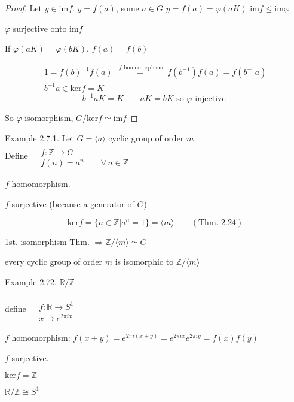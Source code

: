 \documentclass[twoside,landscape]{amsart}
\theoremstyle{plain}
\theoremstyle{definition}
\theoremstyle{remark}
\begin{document}
\begin{multicols*}{2}
\begin{proof}
Let $y\in \text{im}{f}$.  $y=f(a)$, some $a\in G$  \quad \quad $y= f(a) = \varphi(aK)$  \quad \quad $\text{im}{f} \leq \text{im}{\varphi}$

$\varphi$ surjective onto $\text{im}{f}$

If $\varphi(aK) = \varphi(bK)$, $f(a) = f(b)$ 

\[
\begin{gathered}
1 = f(b)^{-1} f(a) \overset{\text{ $f$ homomorphism }}{=} f(b^{-1}) f(a) = f(b^{-1} a)  \\
b^{-1} a \in \text{ker}{f} = K
\end{gathered}
\]
\[
b^{-1} a K = K \quad \quad aK = bK \text{ so  $\varphi$ injective }
\]

So $\varphi $ isomorphism, $G/\text{ker}{f} \simeq \text{im}{f}$

\end{proof}

Example 2.7.1. Let $G = \langle a \rangle$ cyclic group of order $m$ \\
Define $\begin{aligned} & \quad \\ 
  & f: \mathbb{Z} \to G \\
  & f(n) = a^n \quad \quad \forall \, n \in \mathbb{Z} \end{aligned}$

$f$ homomorphism.  

$f$ surjective (because a generator of $G$)

\[
\text{ker}{f} = \lbrace n\in \mathbb{Z} | a^n = 1 \rbrace = \langle m \rangle \quad \quad (\text{Thm. 2.24})
\]

1st. isomorphism Thm. $\Longrightarrow \mathbb{Z}/ \langle m \rangle \simeq G$ 

every cyclic group of order $m$ is isomorphic to $\mathbb{Z}/\langle m \rangle$

Example 2.72.  
$\mathbb{R}/\mathbb{Z}$

define $ \begin{aligned} & \quad \\ 
  & f: \mathbb{R} \to S^1 \\
  & x\mapsto e^{2\pi i x} \end{aligned}$

$f$ homomorphism: $f(x+y) = e^{2\pi i (x+y)} = e^{2\pi i x} e^{2\pi i y} = f(x) f(y)$

$f$ surjective.  

$\text{ker}{f} = \mathbb{Z}$

$\mathbb{R}/\mathbb{Z} \cong S^1$


\end{multicols*}
\end{document}
